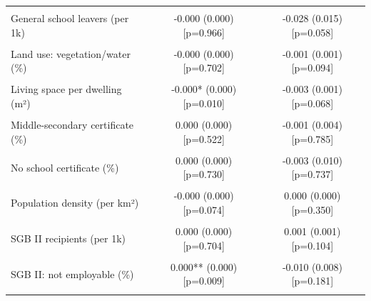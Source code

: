 \begin{table}[!h]
\begin{tabular}{lcc}
\cellcolor{gray!10}{GDP (EUR pc)} & \cellcolor{gray!10}{-0.000 (0.000) [p=0.072]} & \cellcolor{gray!10}{0.000 (0.000) [p=0.233]}\\
General school leavers (per 1k) & -0.000 (0.000) [p=0.966] & -0.028 (0.015) [p=0.058]\\
\cellcolor{gray!10}{Land use: settlement/traffic (\%)} & \cellcolor{gray!10}{0.000 (0.000) [p=0.913]} & \cellcolor{gray!10}{0.001 (0.001) [p=0.094]}\\
Land use: vegetation/water (\%) & -0.000 (0.000) [p=0.702] & -0.001 (0.001) [p=0.094]\\
\addlinespace
\cellcolor{gray!10}{Living space per capita (m²)} & \cellcolor{gray!10}{0.000* (0.000) [p=0.018]} & \cellcolor{gray!10}{-0.004 (0.004) [p=0.345]}\\
Living space per dwelling (m²) & -0.000* (0.000) [p=0.010] & -0.003 (0.001) [p=0.068]\\
\cellcolor{gray!10}{Lower-secondary certificate (\%)} & \cellcolor{gray!10}{0.000 (0.000) [p=0.890]} & \cellcolor{gray!10}{-0.001 (0.005) [p=0.809]}\\
Middle-secondary certificate (\%) & 0.000 (0.000) [p=0.522] & -0.001 (0.004) [p=0.785]\\
\cellcolor{gray!10}{Net migration (‰)} & \cellcolor{gray!10}{0.000 (0.000) [p=0.828]} & \cellcolor{gray!10}{0.001 (0.005) [p=0.880]}\\
\addlinespace
No school certificate (\%) & 0.000 (0.000) [p=0.730] & -0.003 (0.010) [p=0.737]\\
\cellcolor{gray!10}{Population (×1k)} & \cellcolor{gray!10}{0.000 (0.000) [p=0.451]} & \cellcolor{gray!10}{-0.000 (0.000) [p=0.740]}\\
Population density (per km²) & -0.000 (0.000) [p=0.074] & 0.000 (0.000) [p=0.350]\\
\cellcolor{gray!10}{Population, German (×1k)} & \cellcolor{gray!10}{0.000 (0.000) [p=0.658]} & \cellcolor{gray!10}{-0.001 (0.000) [p=0.199]}\\
SGB II recipients (per 1k) & 0.000 (0.000) [p=0.704] & 0.001 (0.001) [p=0.104]\\
\addlinespace
\cellcolor{gray!10}{SGB II: foreign (\%)} & \cellcolor{gray!10}{-0.000 (0.000) [p=0.355]} & \cellcolor{gray!10}{-0.001 (0.003) [p=0.694]}\\
SGB II: not employable (\%) & 0.000** (0.000) [p=0.009] & -0.010 (0.008) [p=0.181]\\
\cellcolor{gray!10}{SV-employed (per 1k)} & \cellcolor{gray!10}{0.000 (0.000) [p=0.595]} & \cellcolor{gray!10}{0.000 (0.000) [p=0.505]}\\

\end{tabular}
\end{table}
